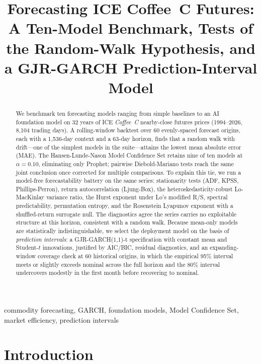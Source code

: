 \documentclass[conference]{IEEEtran}
\title{Forecasting ICE Coffee~C Futures: A Ten-Model Benchmark, Tests of the Random-Walk Hypothesis, and a GJR-GARCH Prediction-Interval Model}
\author{
\IEEEauthorblockN{Bridget Brinkman, Faith Morrissey, Yun-Chih (Rick) Wu, Stella McElwain, Farah Hendawy}
\IEEEauthorblockA{Department of Mathematics, University of Pittsburgh\\
Pittsburgh, Pennsylvania, USA}
}
\begin{document}
\maketitle

\begin{abstract}
We benchmark ten forecasting models ranging from simple baselines
to an AI foundation model on 32 years of ICE \emph{Coffee~C}
nearby-close futures prices (1994--2026, 8{,}104 trading days). A
rolling-window backtest over 60 evenly-spaced forecast origins, each
with a 1{,}536-day context and a 63-day horizon, finds that a random
walk with drift---one of the simplest models in the suite---attains
the lowest mean absolute error (MAE). The Hansen-Lunde-Nason Model
Confidence Set retains nine of ten models at $\alpha = 0.10$,
eliminating only Prophet; pairwise Diebold-Mariano tests reach the
same joint conclusion once corrected for multiple comparisons. To
explain this tie, we run a model-free forecastability battery on the
same series: stationarity tests (ADF, KPSS, Phillips-Perron),
return autocorrelation (Ljung-Box), the heteroskedasticity-robust
Lo-MacKinlay variance ratio, the Hurst exponent under Lo's modified
R/S, spectral predictability, permutation entropy, and the Rosenstein
Lyapunov exponent with a shuffled-return surrogate null. The
diagnostics agree the series carries no exploitable structure at this
horizon, consistent with a random walk.
Because mean-only models are statistically indistinguishable, we
select the deployment model on the basis of \emph{prediction
intervals}: a GJR-GARCH(1{,}1)-t specification with constant mean and
Student-$t$ innovations, justified by AIC/BIC, residual diagnostics,
and an expanding-window coverage check at 60 historical origins, in
which the empirical 95\% interval meets or slightly exceeds nominal
across the full horizon and the 80\% interval undercovers modestly
in the first month before recovering to nominal.
\end{abstract}

\begin{IEEEkeywords}
commodity forecasting, GARCH, foundation models, Model Confidence Set, market efficiency, prediction intervals
\end{IEEEkeywords}

\section{Introduction}
\end{document}
